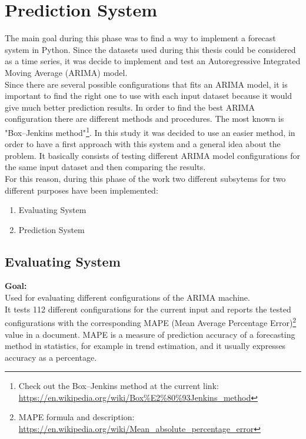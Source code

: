 \chapter{Prediction System}
The main goal during this phase was to find a way to implement a forecast system in Python.
Since the datasets used during this thesis could be considered as a time series, it was decide to implement and test an Autoregressive Integrated Moving Average (ARIMA) model. \\
Since there are several possible configurations that fits an ARIMA model, it is important to find the right one to use with each input dataset because it would give much better prediction results.
In order to find the best ARIMA configuration there are different methods and procedures. The most known is "Box–Jenkins method"\footnote{Check out the Box–Jenkins method at the current link: \\ \url{https://en.wikipedia.org/wiki/Box\%E2\%80\%93Jenkins_method}}. In this study it was decided to use an easier method, in order to have a first approach with this system and a general idea about the problem. It basically consists of testing different ARIMA model configurations for the same input dataset and then comparing the results.\\
For this reason, during this phase of the work two different subsytems for two different purposes have been implemented:
\begin{enumerate}
\item Evaluating System
\item Prediction System
\end{enumerate}

\newpage
\section{Evaluating System}
\textbf{Goal:}\\ 
Used for evaluating different configurations of the ARIMA machine. \\ It tests 112 different configurations for the current input and reports the tested configurations with the corresponding MAPE (Mean Average Percentage Error)\footnote{MAPE formula and description: \\ \url{https://en.wikipedia.org/wiki/Mean_absolute_percentage_error}} value in a document. MAPE is a measure of prediction accuracy of a forecasting method in statistics, for example in trend estimation, and it usually expresses accuracy as a percentage.


